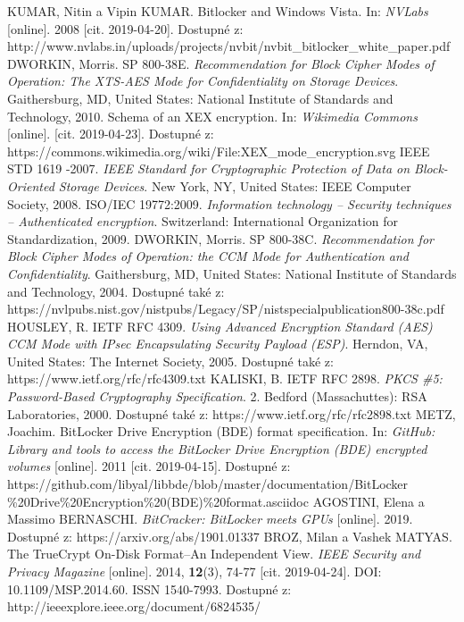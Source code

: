 \documentclass[a4paper,12pt]{article}
\begin{document}
{
KUMAR, Nitin a Vipin KUMAR. Bitlocker and Windows Vista. In: \textit{NVLabs} [online]. 2008 [cit. 2019-04-20]. Dostupné z: http://www.nvlabs.in/uploads/projects/nvbit/nvbit\_bitlocker\_white\_paper.pdf
DWORKIN, Morris. SP 800-38E. \textit{Recommendation for Block Cipher Modes of Operation: The XTS-AES Mode for Confidentiality on Storage Devices}. Gaithersburg, MD, United States: National Institute of Standards and Technology, 2010.
Schema of an XEX encryption. In: \textit{Wikimedia Commons} [online]. [cit. 2019-04-23]. Dostupné z: https://commons.wikimedia.org/wiki/File:XEX\_mode\_encryption.svg
IEEE STD 1619 -2007. \textit{IEEE Standard for Cryptographic Protection of Data on Block-Oriented Storage Devices}. New York, NY, United States: IEEE Computer Society, 2008.
ISO/IEC 19772:2009. \textit{Information technology -- Security techniques -- Authenticated encryption}. Switzerland: International Organization for Standardization, 2009.
DWORKIN, Morris. SP 800-38C. \textit{Recommendation for Block Cipher Modes of Operation: the CCM Mode for Authentication and Confidentiality}. Gaithersburg, MD, United States: National Institute of Standards and Technology, 2004. Dostupné také z: https://nvlpubs.nist.gov/nistpubs/Legacy/SP/nistspecialpublication800-38c.pdf
HOUSLEY, R. IETF RFC 4309. \textit{Using Advanced Encryption Standard (AES) CCM Mode with IPsec Encapsulating Security Payload (ESP)}. Herndon, VA, United States: The Internet Society, 2005. Dostupné také z: https://www.ietf.org/rfc/rfc4309.txt
KALISKI, B. IETF RFC 2898. \textit{PKCS \#5: Password-Based Cryptography Specification}. 2. Bedford (Massachuttes): RSA Laboratories, 2000. Dostupné také z: https://www.ietf.org/rfc/rfc2898.txt
METZ, Joachim. BitLocker Drive Encryption (BDE) format specification. In: \textit{GitHub: Library and tools to access the BitLocker Drive Encryption (BDE) encrypted volumes} [online]. 2011 [cit. 2019-04-15]. Dostupné z: https://github.com/libyal/libbde/blob/master/documentation/BitLocker\\\%20Drive\%20Encryption\%20(BDE)\%20format.asciidoc
AGOSTINI, Elena a Massimo BERNASCHI. \textit{BitCracker: BitLocker meets GPUs} [online]. 2019. Dostupné z: https://arxiv.org/abs/1901.01337
BROZ, Milan a Vashek MATYAS. The TrueCrypt On-Disk Format--An Independent View. \textit{IEEE Security and Privacy Magazine} [online]. 2014, \textbf{12}(3), 74-77 [cit. 2019-04-24]. DOI: 10.1109/MSP.2014.60. ISSN 1540-7993. Dostupné z: http://ieeexplore.ieee.org/document/6824535/
}
\end{document}
